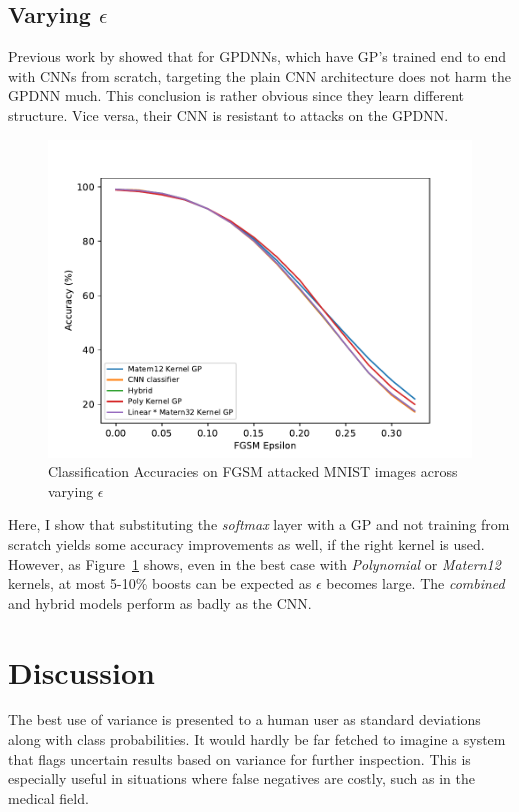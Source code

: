 \documentclass{article}
\begin{document}
\subsection{Varying $\epsilon$}
Previous work by \citet{Bradshaw2017} showed that for GPDNNs, which have GP's trained end to end with CNNs from scratch, targeting the plain CNN architecture does not harm the GPDNN much. This conclusion is rather obvious since they learn different structure. Vice versa, their CNN is resistant to attacks on the GPDNN.

\begin{figure}[h!]
\centering
\includegraphics[width=\hsize]{./figures/adversarial/epsilons.pdf}
\caption{Classification Accuracies on FGSM attacked MNIST images across varying $\epsilon$}
\label{fig:adv:epsilons}
\end{figure}

Here, I show that substituting the \textit{softmax} layer with a GP and not training from scratch yields some accuracy improvements as well, if the right kernel is used. However, as Figure~\ref{fig:adv:epsilons} shows, even in the best case with \textit{Polynomial} or \textit{Matern12} kernels, at most 5-10\% boosts can be expected as $\epsilon$ becomes large. The \textit{combined} and hybrid models perform as badly as the CNN.



\section{Discussion}
\label{sec:discussion}

The best use of variance is presented to a human user as standard deviations along with class probabilities. It would hardly be far fetched to imagine a system that flags uncertain results based on variance for further inspection. This is especially useful in situations where false negatives are costly, such as in the medical field.
\end{document}
